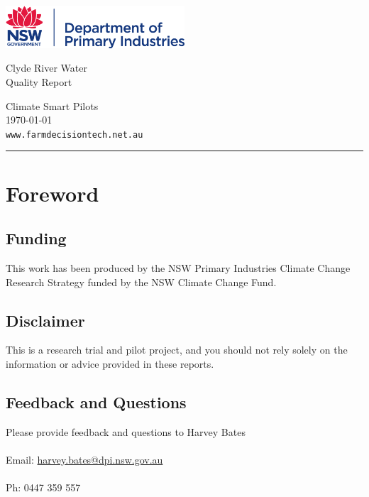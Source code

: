 \documentclass[10pt]{article}
\begin{document}
\begin{titlepage}
	
		\parbox[t]{0.93\textwidth}{
			\parbox[t]{0.91\textwidth}{
				\raggedright
				\fontsize{50pt}{80pt}\selectfont
				\vspace{0.7cm}
				\includegraphics[width=0.5\textwidth]{DPI_logo.png}
				
				Clyde River Water\\
				Quality Report\\
				\vspace{0.7cm}
			}
		}
	\vfill
	\parbox[t]{0.93\textwidth}{ 
		\raggedleft
		\large
		{\Large Climate Smart Pilots}\\[4pt] 
		\today \\
		\vspace{0.5cm}
		\texttt{www.farmdecisiontech.net.au}\\
		
		\hfill\rule{0.2\linewidth}{1pt}
	}
	
\end{titlepage}

\section*{Foreword}

\subsection*{Funding}
This work has been produced by the NSW Primary Industries Climate Change Research Strategy funded by the NSW Climate Change Fund.

\subsection*{Disclaimer}
This is a research trial and pilot project, and you should not rely solely on the information or advice provided in these reports.

\subsection*{Feedback and Questions}
Please provide feedback and questions to Harvey Bates \\ \\
Email: \href{mailto:harvey.bates@dpi.nsw.gov.au}{harvey.bates@dpi.nsw.gov.au} \\ \\
Ph: 0447 359 557
\end{document}
